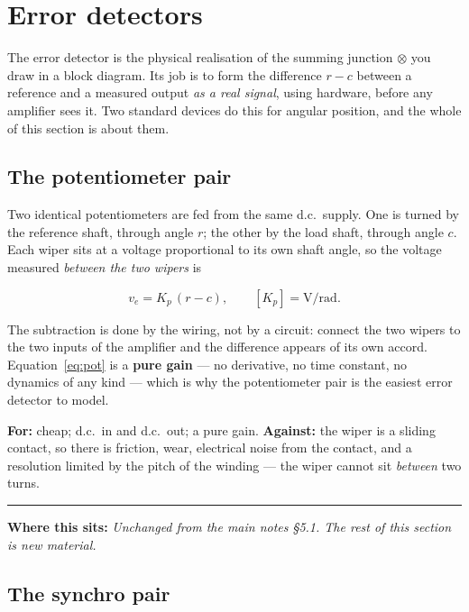 \documentclass[11pt,a4paper]{article}
\newcommand{\statedin}[1]{%
  \par\smallskip\noindent
  \textcolor{fnavy}{\rule{\textwidth}{0.4pt}}\par\vspace{-4pt}
  {\small\textcolor{fnavy}{\textbf{Where this sits:}} \textit{#1}}\par\smallskip}
\begin{document}
\section{Error detectors}

The error detector is the physical realisation of the summing junction
$\otimes$ you draw in a block diagram. Its job is to form the difference
$r-c$ between a reference and a measured output \emph{as a real signal}, using
hardware, before any amplifier sees it. Two standard devices do this for
angular position, and the whole of this section is about them.

\subsection{The potentiometer pair}

Two identical potentiometers are fed from the same d.c.\ supply. One is turned
by the reference shaft, through angle $r$; the other by the load shaft,
through angle $c$. Each wiper sits at a voltage proportional to its own shaft
angle, so the voltage measured \emph{between the two wipers} is

\begin{equation}
  v_{e}=K_{p}\,(r-c),\qquad [K_{p}]=\si{\volt\per\radian}.
  \label{eq:pot}
\end{equation}

The subtraction is done by the wiring, not by a circuit: connect the two
wipers to the two inputs of the amplifier and the difference appears of its
own accord. Equation~\eqref{eq:pot} is a \textbf{pure gain} --- no derivative,
no time constant, no dynamics of any kind --- which is why the potentiometer
pair is the easiest error detector to model.

\smallskip
\textbf{For:} cheap; d.c.\ in and d.c.\ out; a pure gain.
\textbf{Against:} the wiper is a sliding contact, so there is friction, wear,
electrical noise from the contact, and a resolution limited by the pitch of
the winding --- the wiper cannot sit \emph{between} two turns.

\statedin{Unchanged from the main notes \S5.1. The rest of this section is
new material.}

\subsection{The synchro pair}
\label{sec:synchro}
\end{document}
